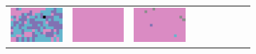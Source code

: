 \documentclass{ipol}
\begin{document}
\begin{figure}[ht]
\begin{subfigure}[t]{\linewidth}
\begin{tabular}{ccccccccc}
                \includegraphics[width=\s]{images/tower/DHT/iso_n5_256_grids.png}&
                \includegraphics[width=\s]{images/tower/LINEAR/iso_n5_256_grids.png}&
                \includegraphics[width=\s]{images/tower/PPG/iso_n5_256_grids.png}&

\end{tabular}
\end{subfigure}
\end{figure}
\end{document}
